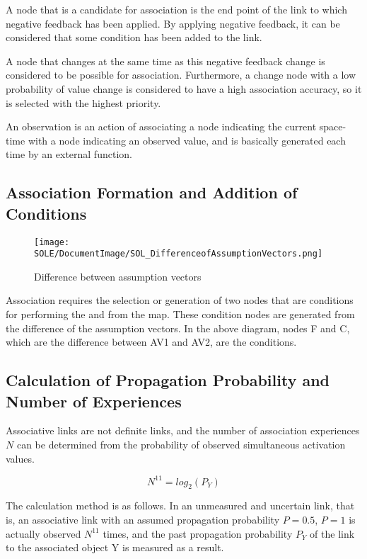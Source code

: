 \documentclass[12pt]{article}
\begin{document}
A node that is a candidate for association is the end point of the link
to which negative feedback has been applied. By applying negative
feedback, it can be considered that some condition has been added to the
link.

A node that changes at the same time as this negative feedback change is
considered to be possible for association. Furthermore, a change node
with a low probability of value change is considered to have a high
association accuracy, so it is selected with the highest priority.

An observation is an action of associating a node indicating the current
 space-time with a node indicating an observed value,
  and is basically generated each time by an external function.

\subsection{Association Formation and Addition of Conditions}\label{association-formation-and-addition-of-conditions}

\begin{figure}[ht]
  \centering
  \texttt{[image: SOLE/DocumentImage/SOL\_DifferenceofAssumptionVectors.png]}
  \caption{Difference between assumption vectors}
  \label{fig:difference_between_assumption_vectors}
\end{figure}

Association requires the selection or generation of two nodes that are
conditions for performing the and from the map. These condition nodes
are generated from the difference of the assumption vectors. In the
above diagram, nodes F and C, which are the difference between AV1 and
AV2, are the conditions.

\subsection{Calculation of Propagation Probability and Number of Experiences}\label{calculation-of-propagation-probability-and-number-of-experiences}

Associative links are not definite links, and the number of association
experiences \(N\) can be determined from the probability of observed
simultaneous activation values.

\[N^{11}=log_2(P_Y)\]

The calculation method is as follows. In an unmeasured and uncertain
link, that is, an associative link with an assumed propagation
probability \(P=0.5\), \(P=1\) is actually observed \(N^{11}\) times,
and the past propagation probability \(P_Y\) of the link to the
associated object Y is measured as a result.
\end{document}
